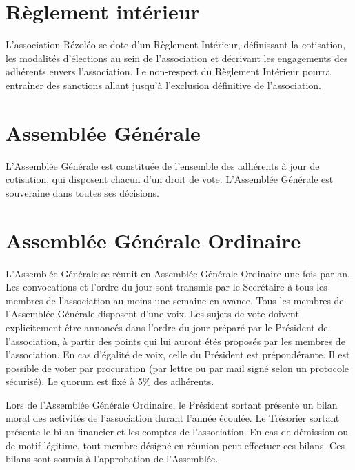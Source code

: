 \documentclass[12pt]{constitution}
\begin{document}

	\section{Règlement intérieur}
	L'association Rézoléo se dote d’un Règlement Intérieur, définissant la cotisation, les modalités d'élections au sein de l'association et décrivant les engagements des adhérents envers l’association. Le non-respect du Règlement Intérieur pourra entraîner des sanctions allant jusqu’à l’exclusion définitive de l’association.

	\section{Assemblée Générale}
	L’Assemblée Générale est constituée de l’ensemble des adhérents à jour de cotisation, qui disposent chacun d’un droit de vote. L’Assemblée Générale est souveraine dans toutes ses décisions.

	\section{Assemblée Générale Ordinaire}
	L'Assemblée Générale se réunit en Assemblée Générale Ordinaire une fois par an. Les convocations et l’ordre du jour sont transmis par le Secrétaire à tous les membres de l’association au moins une semaine en avance. Tous les membres de l'Assemblée Générale disposent d’une voix. Les sujets de vote doivent explicitement être annoncés dans l’ordre du jour préparé par le Président de l'association, à partir des points qui lui auront étés proposés par les membres de l'association. En cas d’égalité de voix, celle du Président est prépondérante. Il est possible de voter par procuration (par lettre ou par mail signé selon un protocole sécurisé). Le quorum est fixé à 5\% des adhérents.

	Lors de l'Assemblée Générale Ordinaire, le Président sortant présente un bilan moral des activités de l’association durant l’année écoulée. Le Trésorier sortant présente le bilan financier et les comptes de l’association. En cas de démission ou de motif légitime, tout membre désigné en réunion peut effectuer ces bilans. Ces bilans sont soumis à l’approbation de l’Assemblée.
\end{document}
